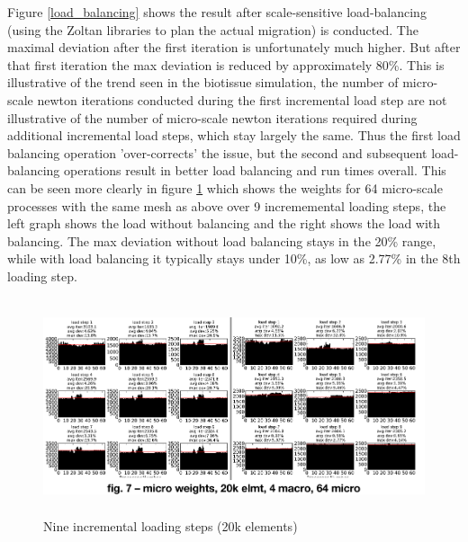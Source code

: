 Figure \ref{load_balancing} shows the result after scale-sensitive load-balancing (using the Zoltan libraries \cite{ZoltanOverviewArticle2002} \cite{ZoltanIsorropiaOverview2012} to plan the actual migration) is conducted. The maximal deviation after the first iteration is unfortunately much higher. But after that first iteration the max deviation is reduced by approximately 80\%. This is illustrative of the trend seen in the biotissue simulation, the number of micro-scale newton iterations conducted during the first incremental load step are not illustrative of the number of micro-scale newton iterations required during additional incremental load steps, which stay largely the same. Thus the first load balancing operation 'over-corrects' the issue, but the second and subsequent load-balancing operations result in better load balancing and run times overall. This can be seen more clearly in figure \ref{10_step_lb} which shows the weights for 64 micro-scale processes with the same mesh as above over 9 incrememental loading steps, the left graph shows the load without balancing and the right shows the load with balancing. The max deviation without load balancing stays in the 20\% range, while with load balancing it typically stays under 10\%, as low as 2.77\% in the 8th loading step.

\begin{figure}
  \begin{center}
    \includegraphics[height=2.5in]{siam_cse_ten.png}
  \end{center}
  \caption{\small Nine incremental loading steps (20k elements)}
  \label{10_step_lb}
\end{figure}

